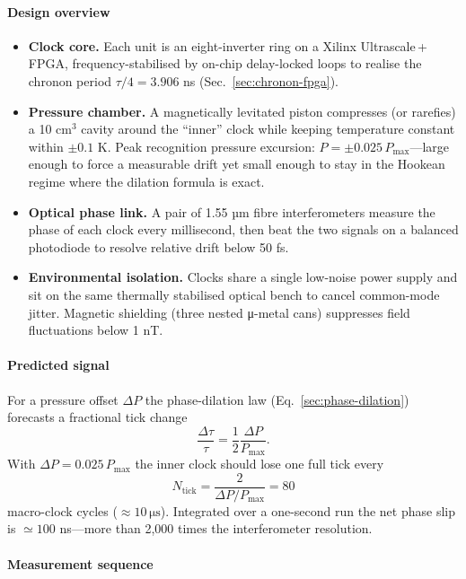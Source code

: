\documentclass[11pt,oneside]{book}
\begin{document}
\paragraph*{Design overview}

\begin{itemize}
\item \textbf{Clock core.}  
  Each unit is an eight-inverter ring on a Xilinx Ultrascale\,+ FPGA, frequency-stabilised by on-chip delay-locked loops to realise the chronon period $\tau/4 = 3.906$ ns (Sec.~\ref{sec:chronon-fpga}).

\item \textbf{Pressure chamber.}  
  A magnetically levitated piston compresses (or rarefies) a 10 cm$^{3}$ cavity around the “inner” clock while keeping temperature constant within $\pm0.1$ K.  Peak recognition pressure excursion: $P = \pm0.025\,P_{\max}$—large enough to force a measurable drift yet small enough to stay in the Hookean regime where the dilation formula is exact.

\item \textbf{Optical phase link.}  
  A pair of 1.55 µm fibre interferometers measure the phase of each clock every millisecond, then beat the two signals on a balanced photodiode to resolve relative drift below 50 fs.

\item \textbf{Environmental isolation.}  
  Clocks share a single low-noise power supply and sit on the same thermally stabilised optical bench to cancel common-mode jitter.  Magnetic shielding (three nested μ-metal cans) suppresses field fluctuations below 1 nT.
\end{itemize}

\paragraph*{Predicted signal}

For a pressure offset $\Delta P$ the phase-dilation law (Eq.~\ref{sec:phase-dilation}) forecasts a fractional tick change
\[
  \frac{\Delta\tau}{\tau}
  = \frac{1}{2}\frac{\Delta P}{P_{\max}}.
\]
With $\Delta P = 0.025\,P_{\max}$ the inner clock should lose one full tick every
\[
  N_{\text{tick}} = \frac{2}{\Delta P/P_{\max}} = 80
\]
macro-clock cycles ($\approx10\,\mathrm{\mu s}$).  Integrated over a one-second run the net phase slip is $\simeq100$ ns—more than 2,000 times the interferometer resolution.

\paragraph*{Measurement sequence}
\end{document}
